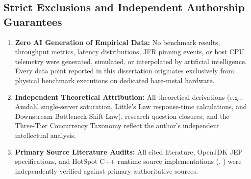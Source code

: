 \subsection{Strict Exclusions and Independent Authorship Guarantees}
\begin{enumerate}
  \item \textbf{Zero AI Generation of Empirical Data:} No benchmark results, throughput metrics, latency distributions, JFR pinning events, or host CPU telemetry were generated, simulated, or interpolated by artificial intelligence. Every data point reported in this dissertation originates exclusively from physical benchmark executions on dedicated bare-metal hardware.
  \item \textbf{Independent Theoretical Attribution:} All theoretical derivations (e.g., Amdahl single-server saturation, Little's Law response-time calculations, and Downstream Bottleneck Shift Law), research question closures, and the Three-Tier Concurrency Taxonomy reflect the author's independent intellectual analysis.
  \item \textbf{Primary Source Literature Audits:} All cited literature, OpenJDK JEP specifications, and HotSpot C++ runtime source implementations (, ) were independently verified against primary authoritative sources.
\end{enumerate}
